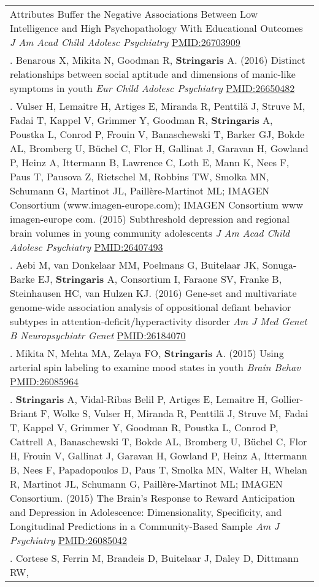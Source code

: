 \documentclass[
]{article}
\begin{document}
\begin{longtable}[]{@{}
  >{\raggedright\arraybackslash}p{}@{}}
Attributes Buffer the Negative Associations Between Low Intelligence and
High Psychopathology With Educational Outcomes \emph{J Am Acad Child
Adolesc Psychiatry} \url{PMID:26703909} \\
132. Benarous X, Mikita N, Goodman R, \textbf{Stringaris} A. (2016)
Distinct relationships between social aptitude and dimensions of
manic-like symptoms in youth \emph{Eur Child Adolesc Psychiatry}
\url{PMID:26650482} \\
133. Vulser H, Lemaitre H, Artiges E, Miranda R, Penttilä J, Struve M,
Fadai T, Kappel V, Grimmer Y, Goodman R, \textbf{Stringaris} A, Poustka
L, Conrod P, Frouin V, Banaschewski T, Barker GJ, Bokde AL, Bromberg U,
Büchel C, Flor H, Gallinat J, Garavan H, Gowland P, Heinz A, Ittermann
B, Lawrence C, Loth E, Mann K, Nees F, Paus T, Pausova Z, Rietschel M,
Robbins TW, Smolka MN, Schumann G, Martinot JL, Paillère-Martinot ML;
IMAGEN Consortium (www.imagen-europe.com); IMAGEN Consortium www
imagen-europe com. (2015) Subthreshold depression and regional brain
volumes in young community adolescents \emph{J Am Acad Child Adolesc
Psychiatry} \url{PMID:26407493} \\
134. Aebi M, van Donkelaar MM, Poelmans G, Buitelaar JK, Sonuga-Barke
EJ, \textbf{Stringaris} A, Consortium I, Faraone SV, Franke B,
Steinhausen HC, van Hulzen KJ. (2016) Gene-set and multivariate
genome-wide association analysis of oppositional defiant behavior
subtypes in attention-deficit/hyperactivity disorder \emph{Am J Med
Genet B Neuropsychiatr Genet} \url{PMID:26184070} \\
135. Mikita N, Mehta MA, Zelaya FO, \textbf{Stringaris} A. (2015) Using
arterial spin labeling to examine mood states in youth \emph{Brain
Behav} \url{PMID:26085964} \\
136. \textbf{Stringaris} A, Vidal-Ribas Belil P, Artiges E, Lemaitre H,
Gollier-Briant F, Wolke S, Vulser H, Miranda R, Penttilä J, Struve M,
Fadai T, Kappel V, Grimmer Y, Goodman R, Poustka L, Conrod P, Cattrell
A, Banaschewski T, Bokde AL, Bromberg U, Büchel C, Flor H, Frouin V,
Gallinat J, Garavan H, Gowland P, Heinz A, Ittermann B, Nees F,
Papadopoulos D, Paus T, Smolka MN, Walter H, Whelan R, Martinot JL,
Schumann G, Paillère-Martinot ML; IMAGEN Consortium. (2015) The Brain's
Response to Reward Anticipation and Depression in Adolescence:
Dimensionality, Specificity, and Longitudinal Predictions in a
Community-Based Sample \emph{Am J Psychiatry} \url{PMID:26085042} \\
137. Cortese S, Ferrin M, Brandeis D, Buitelaar J, Daley D, Dittmann RW,

\end{longtable}
\end{document}
